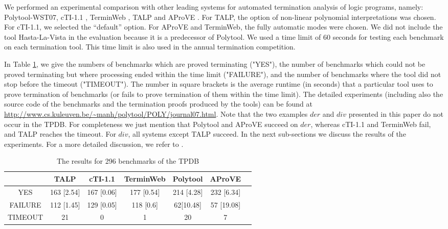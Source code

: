 \documentclass[envcountsame]{tlp}
\newcounter{ex:der-lastsymconsctr}
\begin{document}
We performed an experimental comparison with other leading systems for
automated termination analysis of logic programs,
namely: \textsf{Polytool-WST07}, \textsf{cTI-1.1} \cite{MesnardBagnara05}, \textsf{TerminWeb}
\cite{Codishetal99,terminWeb02}, \textsf{TALP} \cite{OhlebuschAAECC}
and \textsf{AProVE}
\cite{Giesletal06}. 
For \textsf{TALP}, the option of non-linear polynomial
interpretations was chosen. For \textsf{cTI-1.1}, we selected the 
``default'' option. For
\textsf{AProVE} and \textsf{TerminWeb}, the fully automatic modes were
chosen. We did not include the tool \textsf{Hasta-La-Vista}
\cite{SerebrenikandDeSchreye03} in the evaluation because it is a predecessor of
\textsf{Polytool}.
We used a time limit of 60 seconds for testing each benchmark on each
termination tool. This time limit is also used in the
annual termination
  competition.



In Table \ref{table1},
we give the numbers of benchmarks which
are proved terminating (\textsf{"YES"}), the number of benchmarks which could
not be proved terminating but where processing ended within the time limit
(\textsf{"FAILURE"}), and the number of benchmarks where the tool did not stop
before the timeout (\textsf{"TIMEOUT"}). The number in square brackets is the
average runtime (in seconds) that a particular tool uses to prove termination
of benchmarks (or fails to prove termination of them within the time
limit). The detailed experiments (including also the source code of the
benchmarks and the termination proofs 
produced by the tools) can be found at 
\url{http://www.cs.kuleuven.be/~manh/polytool/POLY/journal07.html}.
Note that the two examples $\mathit{der}$ and $\mathit{div}$ presented
in this paper do not occur in the TPDB. For completeness we just mention that
\textsf{Polytool} and \textsf{AProVE} succeed on $\mathit{der}$, whereas
\textsf{cTI-1.1}
and
\textsf{TerminWeb} fail, and \textsf{TALP} reaches the timeout.
For $\mathit{div}$, all systems  except \textsf{TALP} succeed.
In the next sub-sections we discuss the results of the experiments. For a more
detailed discussion, we refer to \cite{ThangThesis}.
\begin{table}[ht]

\begin{center}
\begin{tabular}{|c|c|c|c|c|c|c|}
\hline
     & \textsf{TALP} & \textsf{cTI-1.1} & \textsf{TerminWeb}	 &  \textsf{Polytool} & \textsf{AProVE}\\ \hline
\textsf{YES} & 163 [2.54] & 167 [0.06]      & 177 [0.54]  & 214 [4.28] & 232 [6.34]             \\ \hline
\textsf{FAILURE} & 112 [1.45] & 129 [0.05]      & 118 [0.6] & 62[10.48]    & 57 [19.08]         \\\hline
\textsf{TIMEOUT} & 21  & 0      & 1   & 20     & 7            \\\hline
\end{tabular}
\end{center}
\caption{The results for 296 benchmarks of the TPDB}
\label{table1}
\end{table}
\end{document}
